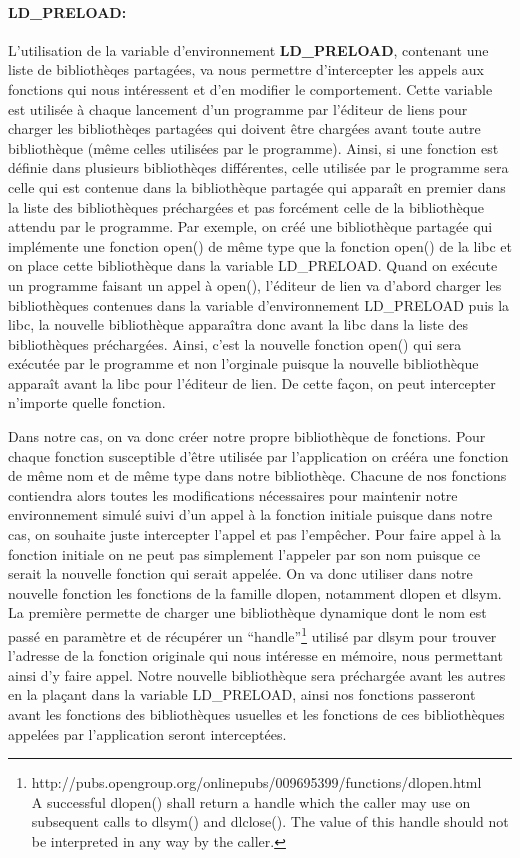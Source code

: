 \paragraph{LD\_PRELOAD:}
L'utilisation de la variable d'environnement
\textbf{LD\_PRELOAD}\cite{INTERCEPTION:LD_PRELOAD}, contenant une liste de
bibliothèqes partagées, va nous permettre d'intercepter les appels aux fonctions
qui nous intéressent et d'en modifier le comportement. Cette variable est
utilisée à chaque lancement d'un programme par l'éditeur de liens pour charger
les bibliothèqes partagées qui doivent être chargées avant toute autre
bibliothèque (même celles utilisées par le programme). Ainsi, si une fonction
est définie dans plusieurs bibliothèqes différentes, celle utilisée par le
programme sera celle qui est contenue dans la bibliothèque partagée qui apparaît
en premier dans la liste des bibliothèques préchargées et pas forcément celle de
la bibliothèque attendu par le programme. Par exemple, on créé une bibliothèque
partagée qui implémente une fonction open() de même type que la fonction open()
de la libc et on place cette bibliothèque dans la variable LD\_PRELOAD. Quand on
exécute un programme faisant un appel à open(), l'éditeur de lien va d'abord
charger les bibliothèques contenues dans la variable d'environnement LD\_PRELOAD
puis la libc, la nouvelle bibliothèque apparaîtra donc avant la libc dans la
liste des bibliothèques préchargées. Ainsi, c'est la nouvelle fonction open()
qui sera exécutée par le programme et non l'orginale puisque la nouvelle
bibliothèque apparaît avant la libc pour l'éditeur de lien. De cette façon, on
peut intercepter n'importe quelle fonction.

Dans notre cas, on va donc créer notre propre bibliothèque de fonctions. Pour
chaque fonction susceptible d'être utilisée par l'application on crééra une
fonction de même nom et de même type dans notre bibliothèqe. Chacune de nos
fonctions contiendra alors toutes les modifications nécessaires pour maintenir
notre environnement simulé suivi d'un appel à la fonction initiale puisque dans
notre cas, on souhaite juste intercepter l'appel et pas l'empêcher. Pour faire
appel à la fonction initiale on ne peut pas simplement l'appeler par son nom
puisque ce serait la nouvelle fonction qui serait appelée. On va donc utiliser
dans notre nouvelle fonction les fonctions de la famille dlopen, notamment
dlopen et dlsym. La première permette de charger une bibliothèque dynamique dont
le nom est passé en paramètre et de récupérer un
``handle''\footnote{http://pubs.opengroup.org/onlinepubs/009695399/functions/dlopen.html
  \\ A successful dlopen() shall return a handle which the caller may use on
  subsequent calls to dlsym() and dlclose(). The value of this handle should not
  be interpreted in any way by the caller.} utilisé par dlsym pour trouver
l'adresse de la fonction originale qui nous intéresse en mémoire, nous
permettant ainsi d'y faire appel. Notre nouvelle bibliothèque sera préchargée
avant les autres en la plaçant dans la variable LD\_PRELOAD, ainsi nos fonctions
passeront avant les fonctions des bibliothèques usuelles et les fonctions de ces
bibliothèques appelées par l'application seront interceptées.

